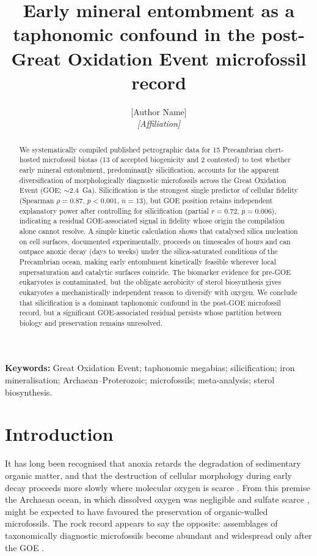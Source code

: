 \documentclass[11pt]{article}
\title{\vspace{-1.0cm}\textbf{Early mineral entombment as a taphonomic confound in the
post-Great Oxidation Event microfossil record}}
\author{[Author Name]\\
\small\textit{[Affiliation]}}
\date{}
\begin{document}
\maketitle

\begin{abstract}
\noindent We systematically compiled published petrographic data for 15 Precambrian chert-hosted
microfossil biotas (13 of accepted biogenicity and 2 contested) to test whether early mineral
entombment, predominantly silicification, accounts for the apparent diversification of
morphologically diagnostic microfossils across the Great Oxidation Event (GOE; $\sim$2.4~Ga).
Silicification is the strongest single predictor of cellular fidelity (Spearman $\rho = 0.87$,
$p < 0.001$, $n = 13$), but GOE position retains independent explanatory power after controlling for
silicification (partial $r = 0.72$, $p = 0.006$), indicating a residual GOE-associated signal in
fidelity whose origin the compilation alone cannot resolve. A simple kinetic calculation shows that
catalysed silica nucleation on cell surfaces, documented experimentally, proceeds on timescales of
hours and can outpace anoxic decay (days to weeks) under the silica-saturated conditions of the
Precambrian ocean, making early entombment kinetically feasible wherever local supersaturation and
catalytic surfaces coincide. The biomarker evidence for pre-GOE eukaryotes is contaminated, but the
obligate aerobicity of sterol biosynthesis gives eukaryotes a mechanistically independent reason to
diversify with oxygen. We conclude that silicification is a dominant taphonomic confound in the
post-GOE microfossil record, but a significant GOE-associated residual persists whose partition
between biology and preservation remains unresolved.
\end{abstract}

\noindent\textbf{Keywords:} Great Oxidation Event; taphonomic megabias; silicification; iron
mineralisation; Archaean--Proterozoic; microfossils; meta-analysis; sterol biosynthesis.

\section{Introduction}

It has long been recognised that anoxia retards the degradation of sedimentary organic matter, and
that the destruction of cellular morphology during early decay proceeds more slowly where molecular
oxygen is scarce \citep{Canfield1994,Hedges1995}. From this premise the Archaean ocean, in which
dissolved oxygen was negligible \citep{Pavlov2002} and sulfate scarce \citep{Habicht2002,Crowe2014},
might be expected to have favoured the preservation of organic-walled microfossils. The rock record
appears to say the opposite: assemblages of taxonomically diagnostic microfossils become abundant
and widespread only after the GOE \citep{Javaux2018,Wacey2014}.
\end{document}
